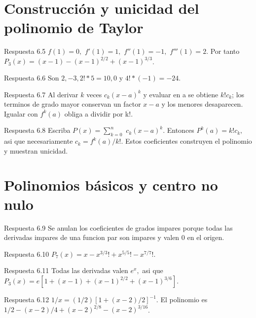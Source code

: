 \documentclass[10pt,a4paper,oneside,openany]{book}
\begin{document}
\section{Construcción y unicidad del polinomio de Taylor}
\begin{PSevenAnswerFixed}{Respuesta 6.5}
\(f(1)=0,\) \(f'(1)=1,\) \(f''(1)=-1,\) \(f'''(1)=2\). Por tanto \(P_3(x)=(x-1)-(x-1)^{2/2}+(x-1)^{3/3}\).
\end{PSevenAnswerFixed}
\begin{PSevenAnswerFixed}{Respuesta 6.6}
Son \(2,-3,2!*5=10,0\) y \(4!*(-1)=-24\).
\end{PSevenAnswerFixed}
\begin{PSevenAnswerFixed}{Respuesta 6.7}
Al derivar \(k\) veces \(c_k(x-a)^k\) y evaluar en a se obtiene \(k!c_k\); los terminos de grado mayor conservan un factor \(x-a\) y los menores desaparecen. Igualar con \(f^{k}(a)\) obliga a dividir por k!.
\end{PSevenAnswerFixed}
\begin{PSevenAnswerFixed}{Respuesta 6.8}
Escriba \(P(x)=\sum_{k=0}^n\) \(c_k(x-a)^k\). Entonces \(P^{k}(a)=k!c_k,\) asi que necesariamente \(c_k=f^{k}(a)/k!\). Estos coeficientes construyen el polinomio y muestran unicidad.
\end{PSevenAnswerFixed}
\section{Polinomios básicos y centro no nulo}
\begin{PSevenAnswerFixed}{Respuesta 6.9}
Se anulan los coeficientes de grados impares porque todas las derivadas impares de una funcion par son impares y valen \(0\) en el origen.
\end{PSevenAnswerFixed}
\begin{PSevenAnswerFixed}{Respuesta 6.10}
\(P_7(x)=x-x^{3/3}!+x^{5/5}!-x^{7/7}!\).
\end{PSevenAnswerFixed}
\begin{PSevenAnswerFixed}{Respuesta 6.11}
Todas las derivadas valen \(e^x,\) asi que \(P_3(x)=e[1+(x-1)+(x-1)^{2/2}+(x-1)^{3/6}]\).
\end{PSevenAnswerFixed}
\begin{PSevenAnswerFixed}{Respuesta 6.12}
\(1/x=(1/2)[1+(x-2)/2]^{-1}\). El polinomio es \(1/2-(x-2)/4+(x-2)^{2/8}-(x-2)^{3/16}\).
\end{PSevenAnswerFixed}
\end{document}
